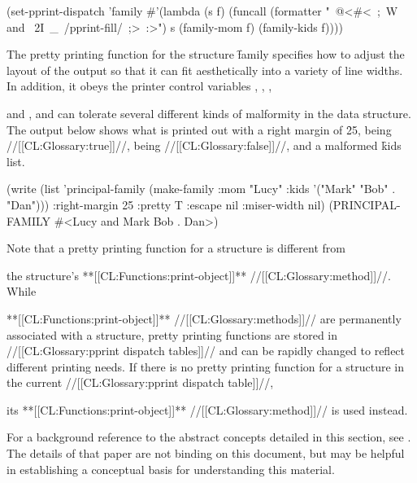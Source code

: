  (set-pprint-dispatch 'family
   #'(lambda (s f)
       (funcall (formatter "~@<#<~;~W and ~2I~_~/pprint-fill/~;>~:>")
               s (family-mom f) (family-kids f))))
\endcode
 
The pretty printing function for the structure \f{family} specifies how to
adjust the layout of the output so that it can fit aesthetically into
a variety of line widths.  In addition, it obeys 
the printer control variables ,
, ,


and ,
and can tolerate several different kinds of malformity in the data structure.
The output below shows what is printed out with a right margin of \f{25},
 being //[[CL:Glossary:true]]//,  being //[[CL:Glossary:false]]//,
and a malformed \f{kids} list.
 
\code
 (write (list 'principal-family
              (make-family :mom "Lucy"
                           :kids '("Mark" "Bob" . "Dan")))
        :right-margin 25 :pretty T :escape nil :miser-width nil)
 (PRINCIPAL-FAMILY
  #<Lucy and
      Mark Bob . Dan>)
\endcode
  
Note that a pretty printing function for a structure is different from

the structure's **[[CL:Functions:print-object]]** //[[CL:Glossary:method]]//.
While

**[[CL:Functions:print-object]]** //[[CL:Glossary:methods]]//
are permanently associated with a structure,
pretty printing functions are stored in 
//[[CL:Glossary:pprint dispatch tables]]// and can be rapidly changed to reflect 
different printing needs.  If there is no pretty printing function for 
a structure in the current //[[CL:Glossary:pprint dispatch table]]//,

its **[[CL:Functions:print-object]]** //[[CL:Glossary:method]]//
is used instead.


\endsubSection%


For a background reference to the abstract concepts detailed in this
section, see \XPPaper.  The details of that paper are not binding on
this document, but may be helpful in establishing a conceptual basis for
understanding this material.

\endsubsection%


